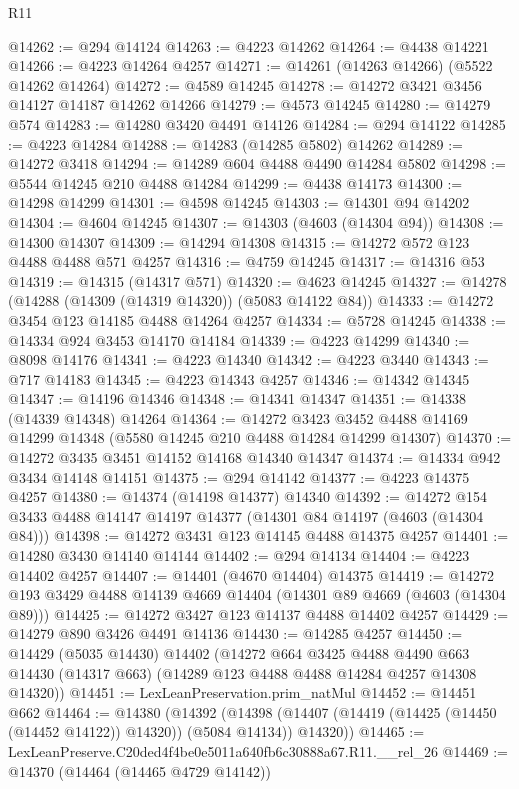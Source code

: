 \begin{lexlean}{R11}
\begin{coremodule}
@14262 := @294 @14124
@14263 := @4223 @14262
@14264 := @4438 @14221
@14266 := @4223 @14264 @4257
@14271 := @14261 (@14263 @14266) (@5522 @14262 @14264)
@14272 := @4589 @14245
@14278 := @14272 @3421 @3456 @14127 @14187 @14262 @14266
@14279 := @4573 @14245
@14280 := @14279 @574
@14283 := @14280 @3420 @4491 @14126
@14284 := @294 @14122
@14285 := @4223 @14284
@14288 := @14283 (@14285 @5802) @14262
@14289 := @14272 @3418
@14294 := @14289 @604 @4488 @4490 @14284 @5802
@14298 := @5544 @14245 @210 @4488 @14284
@14299 := @4438 @14173
@14300 := @14298 @14299
@14301 := @4598 @14245
@14303 := @14301 @94 @14202
@14304 := @4604 @14245
@14307 := @14303 (@4603 (@14304 @94))
@14308 := @14300 @14307
@14309 := @14294 @14308
@14315 := @14272 @572 @123 @4488 @4488 @571 @4257
@14316 := @4759 @14245
@14317 := @14316 @53
@14319 := @14315 (@14317 @571)
@14320 := @4623 @14245
@14327 := @14278 (@14288 (@14309 (@14319 @14320)) (@5083 @14122 @84))
@14333 := @14272 @3454 @123 @14185 @4488 @14264 @4257
@14334 := @5728 @14245
@14338 := @14334 @924 @3453 @14170 @14184
@14339 := @4223 @14299
@14340 := @8098 @14176
@14341 := @4223 @14340
@14342 := @4223 @3440
@14343 := @717 @14183
@14345 := @4223 @14343 @4257
@14346 := @14342 @14345
@14347 := @14196 @14346
@14348 := @14341 @14347
@14351 := @14338 (@14339 @14348) @14264
@14364 := @14272
    @3423
    @3452
    @4488
    @14169
    @14299
    @14348
    (@5580 @14245 @210 @4488 @14284 @14299 @14307)
@14370 := @14272 @3435 @3451 @14152 @14168 @14340 @14347
@14374 := @14334 @942 @3434 @14148 @14151
@14375 := @294 @14142
@14377 := @4223 @14375 @4257
@14380 := @14374 (@14198 @14377) @14340
@14392 := @14272 @154 @3433 @4488 @14147 @14197 @14377 (@14301 @84 @14197 (@4603 (@14304 @84)))
@14398 := @14272 @3431 @123 @14145 @4488 @14375 @4257
@14401 := @14280 @3430 @14140 @14144
@14402 := @294 @14134
@14404 := @4223 @14402 @4257
@14407 := @14401 (@4670 @14404) @14375
@14419 := @14272 @193 @3429 @4488 @14139 @4669 @14404 (@14301 @89 @4669 (@4603 (@14304 @89)))
@14425 := @14272 @3427 @123 @14137 @4488 @14402 @4257
@14429 := @14279 @890 @3426 @4491 @14136
@14430 := @14285 @4257
@14450 := @14429
    (@5035 @14430)
    @14402
    (@14272
      @664
      @3425
      @4488
      @4490
      @663
      @14430
      (@14317 @663)
      (@14289 @123 @4488 @4488 @14284 @4257 @14308 @14320))
@14451 := LexLeanPreservation.prim_natMul
@14452 := @14451 @662
@14464 := @14380
    (@14392
      (@14398 (@14407 (@14419 (@14425 (@14450 (@14452 @14122)) @14320)) (@5084 @14134)) @14320))
@14465 := LexLeanPreserve.C20ded4f4be0e5011a640fb6c30888a67.R11.__rel_26
@14469 := @14370 (@14464 (@14465 @4729 @14142))

\end{coremodule}
\end{lexlean}
